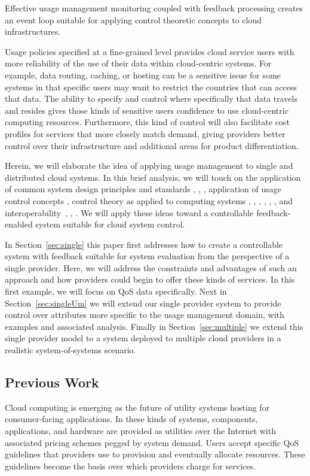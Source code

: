 \documentclass[times, 10pt,twocolumn]{article}
\begin{document}
Effective usage management monitoring coupled with feedback processing creates an event loop suitable for applying control theoretic concepts to cloud infrastructures.

Usage policies specified at a fine-grained level provides cloud service users with more reliability of the use of their data within cloud-centric systems.  For example, data routing, caching, or hosting can be a sensitive issue for some systems in that specific users may want to restrict the countries that can access that data.  The ability to specify and control where specifically that data travels and resides gives those kinds of sensitive users confidence to use cloud-centric computing resources.  Furthermore, this kind of control will also facilitate cost profiles for services that more closely match demand, giving providers better control over their infrastructure and additional areas for product differentiation.

Herein, we will elaborate the idea of applying usage management to single and distributed cloud systems.  In this brief analysis, we will touch on the application of common system design principles and standards \cite{BlCl:01}, \cite{Cl:88}, \cite{ClWrSoBr:02}, application of usage control concepts \cite{JaHe:08a,JaHeLa:10,PaSa:04}, control theory as applied to computing systems \cite{ctrl:Zhu:2009:CTB:1496909.1496922}, \cite{ctrl:ariba-GL:2009}, \cite{ctrl:wang-cgswrzh:2009}, \cite{ctrl:kjaer-kr:2009}, \cite{ctrl:abdelwahed-bsk:2009}, \cite{ctrl:hellerstein-sw:2009}, and interoperability~\cite{JaHe:04}, \cite{HeJa:05}, \cite{KoLaMaMi:04}.  We will apply these ideas toward a controllable feedback-enabled system suitable for cloud system control.

In Section~\ref{sec:single} this paper first addresses how to create a controllable system with feedback suitable for system evaluation from the perspective of a single provider. Here, we will address the constraints and advantages of such an approach and how providers could begin to offer these kinds of services.  In this first example, we will focus on QoS data specifically.  Next in Section~\ref{sec:singleUm} we will extend our single provider system to provide control over attributes more specific to the usage management domain, with examples and associated analysis.  Finally in Section~\ref{sec:multiple} we extend this single provider model to a system deployed to multiple cloud providers in a realistic system-of-systems scenario.

\subsection{Previous Work}
Cloud computing is emerging as the future of utility systems hosting for consumer-facing applications.  In these kinds of systems, components, applications, and hardware are provided as utilities over the Internet with associated pricing schemes pegged by system demand.  Users accept specific QoS guidelines that providers use to provision and eventually allocate resources. These guidelines become the basis over which providers charge for services.
\end{document}
